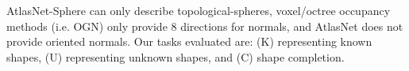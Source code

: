 \begin{table}[t]
{  %
  AtlasNet-Sphere can only describe topological-spheres, voxel/octree occupancy methods (i.e. OGN) only provide 8 directions for normals, and AtlasNet does not provide oriented normals. Our tasks evaluated are: (K) representing known shapes, (U) representing unknown shapes, and (C) shape completion.} 
  \label{tab:1}
\end{table}